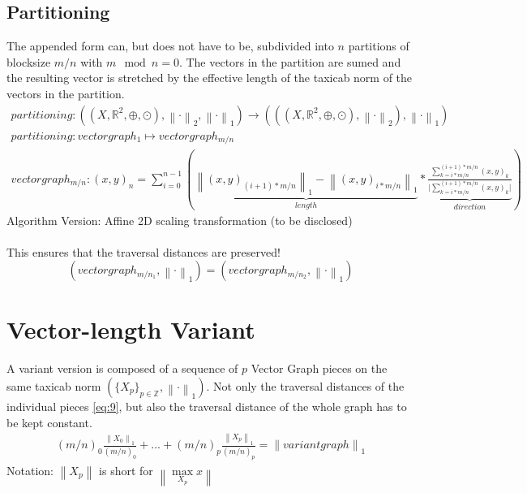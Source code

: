 \documentclass{report}
\newcommand\norm[1]{\left\lVert#1\right\rVert}
\begin{document}
\section{Partitioning}
The appended form can, but does not have to be, subdivided into $n$ partitions of blocksize $m/n$ with $m\mod n=0$. The vectors in the partition are sumed and the resulting vector is stretched by the effective length of the taxicab norm of the vectors in the partition.
\begin{align}
partitioning: ((X,\mathbb{R}^2,\oplus,\odot),\norm{\cdot}_2,\norm{\cdot}_1) \rightarrow (((X,\mathbb{R}^2,\oplus,\odot),\norm{\cdot}_2),\norm{\cdot}_1)\\
partitioning: vectorgraph_{1} \mapsto vectorgraph_{m/n}\\
vectorgraph_{m/n}:(x,y)_{n}=\sum_{i=0}^{n-1} (\underbrace{\norm{(x,y)_{(i+1)*m/n}}_{1} - \norm{(x,y)_{i*m/n}}_{1}}_{length} * \underbrace{\frac{\sum_{k=i*m/n}^{(i+1)*m/n} (x,y)_{k}}{\vert \sum_{k=i*m/n}^{(i+1)*m/n} (x,y)_{k} \vert}}_{direction})
\end{align}
Algorithm Version: Affine 2D scaling transformation (to be disclosed)\\\\
This ensures that the traversal distances are preserved!
\begin{equation}
(vectorgraph_{m/n_{1}},\norm{\cdot}_{1})=(vectorgraph_{m/n_{2}},\norm{\cdot}_{1})\label{eq:9}
\end{equation}
\chapter{Vector-length Variant}
A variant version is composed of a sequence of $p$ Vector Graph pieces on the same taxicab norm $(\{X_{p}\}_{p\in \mathbb{Z}},\norm{\cdot}_1)$. Not only the traversal distances of the individual pieces \eqref{eq:9}, but also the traversal distance of the whole graph has to be kept constant.
\begin{align}
(m/n)_{0}\frac{\norm{X_{0}}_{1}}{(m/n)_{0}}+...+(m/n)_{p}\frac{\norm{X_{p}}_{1}}{(m/n)_{p}}=\norm{variantgraph}_1
\end{align}
Notation: $\norm{X_{p}}$ is short for $\norm{\max \limits _{X_{p}} x}$
\end{document}

